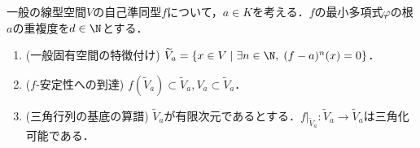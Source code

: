 \documentclass[uplatex, dvipdfmx]{jsreport}
\begin{document}
\begin{proposition}[一般固有空間への制限は三角化可能である]\label{prop-algorithm-for-making-triangular-matrices}
    一般の線型空間$V$の自己準同型$f$について，$a\in K$を考える．$f$の最小多項式$\varphi$の根$a$の重複度を$d\in\N$とする．
    \begin{enumerate}
        \item (一般固有空間の特徴付け) $\widetilde{V}_a=\{x\in V\mid\exists n\in\N,\; (f-a)^n(x)=0\}$．
        \item ($f$-安定性への到達) $f(\widetilde{V}_a)\subset\widetilde{V}_a,V_a\subset\widetilde{V}_a$．
        \item (三角行列の基底の算譜) $\widetilde{V}_a$が有限次元であるとする．$f|_{\widetilde{V}_a}:\widetilde{V}_a\to\widetilde{V}_a$は三角化可能である．
    \end{enumerate}
\end{proposition}
\end{document}
